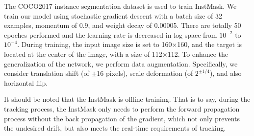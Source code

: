\documentclass[review]{elsarticle}
\begin{document}
The COCO2017 \cite{Lin2014MicrosoftCC} instance segmentation dataset is used to train InstMask. We train our model using stochastic gradient descent with a batch size of 32 examples, momentum of 0.9, and weight decay of 0.00005. There are totally 50 epoches performed and the learning rate is decreased in log space from $10^{-2}$ to $10^{-4}$. During training, the input image size is set to 160$\times$160, and the target is located at the center of the image, with a size of 112$\times$112. To enhance the generalization of the network, we perform data augmentation. Specifically, we consider translation shift (of $\pm$16 pixels), scale deformation (of $2^{\pm 1/4}$), and also horizontal flip.

It should be noted that the InstMask is offline training. That is to say, during the tracking process, the InstMask only needs to perform the forward propagation process without the back propagation of the gradient, which not only prevents the undesired drift, but also meets the real-time requirements of tracking.
\end{document}
